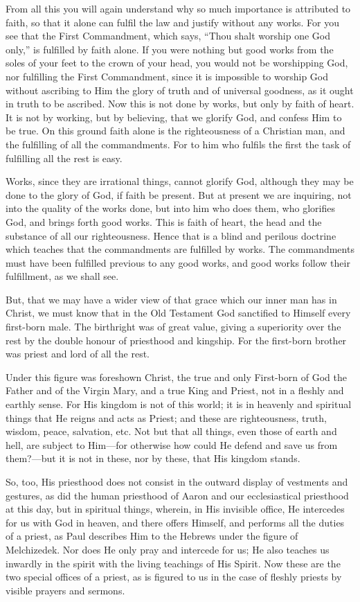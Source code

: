 From all this you will again understand why so much importance is
attributed to faith, so that it alone can fulfil the law and justify
without any works. For you see that the First Commandment, which says,
``Thou shalt worship one God only,'' is fulfilled by faith alone. If you
were nothing but good works from the soles of your feet to the crown of
your head, you would not be worshipping God, nor fulfilling the First
Commandment, since it is impossible to worship God without ascribing to
Him the glory of truth and of universal goodness, as it ought in truth to
be ascribed. Now this is not done by works, but only by faith of heart. It
is not by working, but by believing, that we glorify God, and confess Him
to be true. On this ground faith alone is the righteousness of a Christian
man, and the fulfilling of all the commandments. For to him who fulfils
the first the task of fulfilling all the rest is easy.

Works, since they are irrational things, cannot glorify God, although they
may be done to the glory of God, if faith be present. But at present we
are inquiring, not into the quality of the works done, but into him who
does them, who glorifies God, and brings forth good works. This is faith
of heart, the head and the substance of all our righteousness. Hence that
is a blind and perilous doctrine which teaches that the commandments are
fulfilled by works. The commandments must have been fulfilled previous to
any good works, and good works follow their fulfillment, as we shall see.

But, that we may have a wider view of that grace which our inner man has
in Christ, we must know that in the Old Testament God sanctified to
Himself every first-born male. The birthright was of great value, giving a
superiority over the rest by the double honour of priesthood and kingship.
For the first-born brother was priest and lord of all the rest.

Under this figure was foreshown Christ, the true and only First-born of
God the Father and of the Virgin Mary, and a true King and Priest, not in
a fleshly and earthly sense. For His kingdom is not of this world; it is
in heavenly and spiritual things that He reigns and acts as Priest; and
these are righteousness, truth, wisdom, peace, salvation, etc. Not but
that all things, even those of earth and hell, are subject to Him—for
otherwise how could He defend and save us from them?—but it is not
in these, nor by these, that His kingdom stands.

So, too, His priesthood does not consist in the outward display of
vestments and gestures, as did the human priesthood of Aaron and our
ecclesiastical priesthood at this day, but in spiritual things, wherein,
in His invisible office, He intercedes for us with God in heaven, and
there offers Himself, and performs all the duties of a priest, as Paul
describes Him to the Hebrews under the figure of Melchizedek. Nor does He
only pray and intercede for us; He also teaches us inwardly in the spirit
with the living teachings of His Spirit. Now these are the two special
offices of a priest, as is figured to us in the case of fleshly priests by
visible prayers and sermons.

